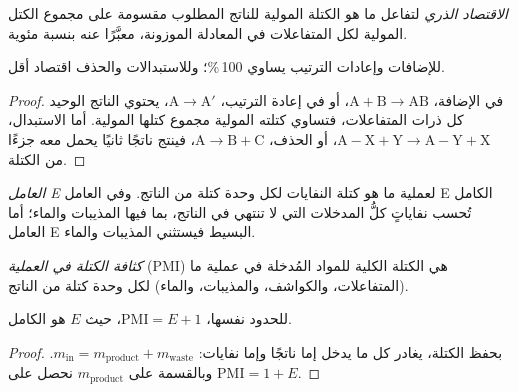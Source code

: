 \begin{definition}\label{def:b3:green-industrial:atom-economy}
\emph{الاقتصاد الذري} لتفاعل ما هو الكتلة المولية
للناتج المطلوب مقسومة على مجموع الكتل المولية لكل
المتفاعلات في المعادلة الموزونة، معبَّرًا عنه بنسبة مئوية.
\end{definition}

\begin{proposition}\label{prop:b3:green-industrial:ae-classes}
للإضافات وإعادات الترتيب  يساوي 100\,\%؛ وللاستبدالات
والحذف اقتصاد أقل.
\end{proposition}

\begin{proof}
في الإضافة، $\mathrm{A} + \mathrm{B} \to \mathrm{AB}$، أو في إعادة الترتيب، $\mathrm{A} \to \mathrm{A'}$، يحتوي الناتج الوحيد كل
ذرات المتفاعلات، فتساوي كتلته المولية مجموع كتلها المولية. أما
الاستبدال، $\mathrm{A{-}X} + \mathrm{Y} \to \mathrm{A{-}Y} + \mathrm{X}$، أو الحذف، $\mathrm{A} \to \mathrm{B} + \mathrm{C}$، فينتج
ناتجًا ثانيًا يحمل معه جزءًا من الكتلة.
\end{proof}

\begin{definition}[العامل E]\label{def:b3:green-industrial:e-factor}
\emph{العامل E} لعملية ما هو كتلة النفايات لكل وحدة كتلة من
الناتج. وفي العامل E الكامل تُحسب نفاياتٍ كلُّ المدخلات التي لا تنتهي في الناتج،
بما فيها المذيبات والماء؛ أما العامل E البسيط فيستثني المذيبات
والماء.
\end{definition}

\begin{definition}\label{def:b3:green-industrial:pmi}
\emph{كثافة الكتلة في العملية} (PMI) هي
الكتلة الكلية للمواد المُدخلة في عملية ما (المتفاعلات، والكواشف، والمذيبات،
والماء) لكل وحدة كتلة من الناتج.
\end{definition}

\begin{proposition}\label{prop:b3:green-industrial:pmi-e}
للحدود نفسها، $\mathrm{PMI} = E + 1$، حيث $E$ هو  الكامل.
\end{proposition}

\begin{proof}
بحفظ الكتلة، يغادر كل ما يدخل إما ناتجًا وإما نفايات:
$m_{\mathrm{in}} = m_{\mathrm{product}} + m_{\mathrm{waste}}$. وبالقسمة على $m_{\mathrm{product}}$ نحصل على $\mathrm{PMI} = 1 + E$.
\end{proof}


